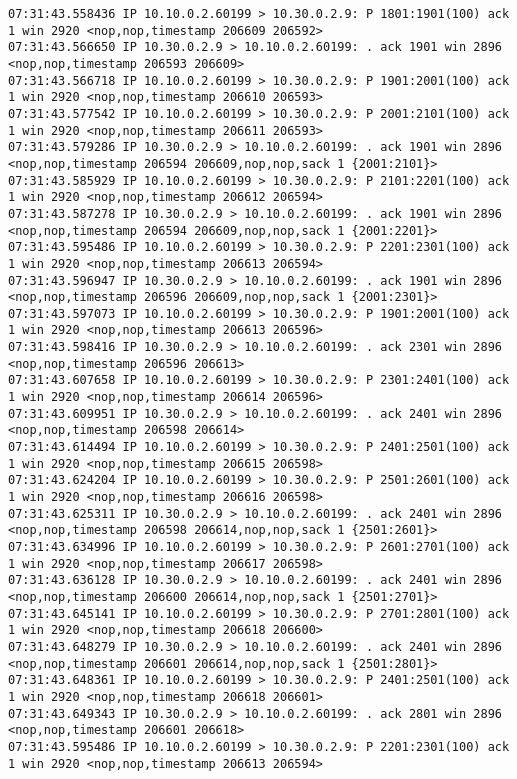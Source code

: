 \documentclass[a4paper,12pt]{article}
\begin{document}
\begin{Verbatim}
07:31:43.558436 IP 10.10.0.2.60199 > 10.30.0.2.9: P 1801:1901(100) ack 1 win 2920 <nop,nop,timestamp 206609 206592>
07:31:43.566650 IP 10.30.0.2.9 > 10.10.0.2.60199: . ack 1901 win 2896 <nop,nop,timestamp 206593 206609>
07:31:43.566718 IP 10.10.0.2.60199 > 10.30.0.2.9: P 1901:2001(100) ack 1 win 2920 <nop,nop,timestamp 206610 206593>
07:31:43.577542 IP 10.10.0.2.60199 > 10.30.0.2.9: P 2001:2101(100) ack 1 win 2920 <nop,nop,timestamp 206611 206593>
07:31:43.579286 IP 10.30.0.2.9 > 10.10.0.2.60199: . ack 1901 win 2896 <nop,nop,timestamp 206594 206609,nop,nop,sack 1 {2001:2101}>
07:31:43.585929 IP 10.10.0.2.60199 > 10.30.0.2.9: P 2101:2201(100) ack 1 win 2920 <nop,nop,timestamp 206612 206594>
07:31:43.587278 IP 10.30.0.2.9 > 10.10.0.2.60199: . ack 1901 win 2896 <nop,nop,timestamp 206594 206609,nop,nop,sack 1 {2001:2201}>
07:31:43.595486 IP 10.10.0.2.60199 > 10.30.0.2.9: P 2201:2301(100) ack 1 win 2920 <nop,nop,timestamp 206613 206594>
07:31:43.596947 IP 10.30.0.2.9 > 10.10.0.2.60199: . ack 1901 win 2896 <nop,nop,timestamp 206596 206609,nop,nop,sack 1 {2001:2301}>
07:31:43.597073 IP 10.10.0.2.60199 > 10.30.0.2.9: P 1901:2001(100) ack 1 win 2920 <nop,nop,timestamp 206613 206596>
07:31:43.598416 IP 10.30.0.2.9 > 10.10.0.2.60199: . ack 2301 win 2896 <nop,nop,timestamp 206596 206613>
07:31:43.607658 IP 10.10.0.2.60199 > 10.30.0.2.9: P 2301:2401(100) ack 1 win 2920 <nop,nop,timestamp 206614 206596>
07:31:43.609951 IP 10.30.0.2.9 > 10.10.0.2.60199: . ack 2401 win 2896 <nop,nop,timestamp 206598 206614>
07:31:43.614494 IP 10.10.0.2.60199 > 10.30.0.2.9: P 2401:2501(100) ack 1 win 2920 <nop,nop,timestamp 206615 206598>
07:31:43.624204 IP 10.10.0.2.60199 > 10.30.0.2.9: P 2501:2601(100) ack 1 win 2920 <nop,nop,timestamp 206616 206598>
07:31:43.625311 IP 10.30.0.2.9 > 10.10.0.2.60199: . ack 2401 win 2896 <nop,nop,timestamp 206598 206614,nop,nop,sack 1 {2501:2601}>
07:31:43.634996 IP 10.10.0.2.60199 > 10.30.0.2.9: P 2601:2701(100) ack 1 win 2920 <nop,nop,timestamp 206617 206598>
07:31:43.636128 IP 10.30.0.2.9 > 10.10.0.2.60199: . ack 2401 win 2896 <nop,nop,timestamp 206600 206614,nop,nop,sack 1 {2501:2701}>
07:31:43.645141 IP 10.10.0.2.60199 > 10.30.0.2.9: P 2701:2801(100) ack 1 win 2920 <nop,nop,timestamp 206618 206600>
07:31:43.648279 IP 10.30.0.2.9 > 10.10.0.2.60199: . ack 2401 win 2896 <nop,nop,timestamp 206601 206614,nop,nop,sack 1 {2501:2801}>
07:31:43.648361 IP 10.10.0.2.60199 > 10.30.0.2.9: P 2401:2501(100) ack 1 win 2920 <nop,nop,timestamp 206618 206601>
07:31:43.649343 IP 10.30.0.2.9 > 10.10.0.2.60199: . ack 2801 win 2896 <nop,nop,timestamp 206601 206618>
07:31:43.595486 IP 10.10.0.2.60199 > 10.30.0.2.9: P 2201:2301(100) ack 1 win 2920 <nop,nop,timestamp 206613 206594>

\end{Verbatim}
\end{document}
